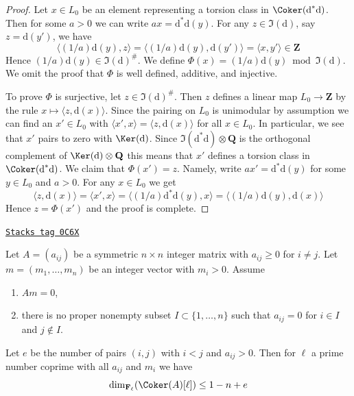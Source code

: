 \begin{proof}
Let $x \in L_0$ be an element representing a torsion
class in $\Coker(\text{d}^*\text{d})$.
Then for some $a > 0$ we can write $ax = \text{d}^*\text{d}(y)$.
For any $z \in \Im(\text{d})$, say $z = \text{d}(y')$, we have
$$
\langle (1/a)\text{d}(y), z \rangle =
\langle (1/a)\text{d}(y), \text{d}(y') \rangle =
\langle x, y' \rangle \in \mathbf{Z}
$$
Hence $(1/a)\text{d}(y) \in \Im(\text{d})^\#$. We define
$\Phi(x) = (1/a)\text{d}(y) \bmod \Im(\text{d})$.
We omit the proof that $\Phi$ is well defined, additive, and injective.

\medskip\noindent
To prove $\Phi$ is surjective, let $z \in \Im(\text{d})^\#$.
Then $z$ defines a linear map $L_0 \to \mathbf{Z}$
by the rule $x \mapsto \langle z, \text{d}(x)\rangle$.
Since the pairing on $L_0$ is unimodular by assumption
we can find an $x' \in L_0$ with
$\langle x', x \rangle = \langle z, \text{d}(x)\rangle$
for all $x \in L_0$. In particular, we see
that $x'$ pairs to zero with $\Ker(\text{d})$.
Since $\Im(\text{d}^*\text{d}) \otimes \mathbf{Q}$
is the orthogonal complement of $\Ker(\text{d}) \otimes \mathbf{Q}$
this means that $x'$ defines a torsion class in
$\Coker(\text{d}^*\text{d})$. We claim that $\Phi(x') = z$.
Namely, write $a x' = \text{d}^*\text{d}(y)$
for some $y \in L_0$ and $a > 0$.
For any $x \in L_0$ we get
$$
\langle z, \text{d}(x)\rangle =
\langle x', x \rangle =
\langle (1/a)\text{d}^*\text{d}(y), x \rangle =
\langle (1/a)\text{d}(y),\text{d}(x) \rangle
$$
Hence $z = \Phi(x')$ and the proof is complete.
\end{proof}

\begin{lemma}
\label{models-lemma-recurring-symmetric-integer}
\href{https://stacks.math.columbia.edu/tag/0C6X}{\texttt{Stacks tag 0C6X}}

Let $A = (a_{ij})$ be a symmetric $n \times n$ integer matrix with
$a_{ij} \geq 0$ for $i \not = j$. Let $m = (m_1, \ldots, m_n)$ be an
integer vector with $m_i > 0$. Assume
\begin{enumerate}
\item $Am = 0$,
\item there is no proper nonempty subset $I \subset \{1, \ldots, n\}$
such that $a_{ij} = 0$ for $i \in I$ and $j \not \in I$.
\end{enumerate}
Let $e$ be the number of pairs $(i, j)$ with $i < j$ and $a_{ij} > 0$.
Then for $\ell$ a prime number coprime with all $a_{ij}$ and $m_i$
we have
$$
\dim_{\mathbf{F}_\ell}(\Coker(A)[\ell]) \leq 1 - n + e
$$
\end{lemma}


